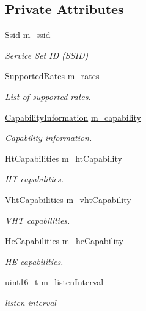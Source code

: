 \subsection*{Private Attributes}
\begin{DoxyCompactItemize}
\item 
\hyperlink{classns3_1_1Ssid}{Ssid} \hyperlink{classns3_1_1MgtAssocRequestHeader_ac08bb2e24a653b5eea454497911a03f0}{m\+\_\+ssid}
\begin{DoxyCompactList}\small\item\em Service Set ID (S\+S\+ID) \end{DoxyCompactList}\item 
\hyperlink{classns3_1_1SupportedRates}{Supported\+Rates} \hyperlink{classns3_1_1MgtAssocRequestHeader_a050dc69a92791e9b36a3fcc06895d7c5}{m\+\_\+rates}
\begin{DoxyCompactList}\small\item\em List of supported rates. \end{DoxyCompactList}\item 
\hyperlink{classns3_1_1CapabilityInformation}{Capability\+Information} \hyperlink{classns3_1_1MgtAssocRequestHeader_a601bbf93b52f5ea7c377cce1a995e27d}{m\+\_\+capability}
\begin{DoxyCompactList}\small\item\em Capability information. \end{DoxyCompactList}\item 
\hyperlink{classns3_1_1HtCapabilities}{Ht\+Capabilities} \hyperlink{classns3_1_1MgtAssocRequestHeader_a3800a8ad77dd20c34b2ada10b627e0dc}{m\+\_\+ht\+Capability}
\begin{DoxyCompactList}\small\item\em HT capabilities. \end{DoxyCompactList}\item 
\hyperlink{classns3_1_1VhtCapabilities}{Vht\+Capabilities} \hyperlink{classns3_1_1MgtAssocRequestHeader_a73ac2a31317dfef487416c10a87d028e}{m\+\_\+vht\+Capability}
\begin{DoxyCompactList}\small\item\em V\+HT capabilities. \end{DoxyCompactList}\item 
\hyperlink{classns3_1_1HeCapabilities}{He\+Capabilities} \hyperlink{classns3_1_1MgtAssocRequestHeader_afe750ae5dbe358b3e863651a67ccd31b}{m\+\_\+he\+Capability}
\begin{DoxyCompactList}\small\item\em HE capabilities. \end{DoxyCompactList}\item 
uint16\+\_\+t \hyperlink{classns3_1_1MgtAssocRequestHeader_abccc493ed5f731d851ed6c999999b396}{m\+\_\+listen\+Interval}
\begin{DoxyCompactList}\small\item\em listen interval \end{DoxyCompactList}\end{DoxyCompactItemize}
